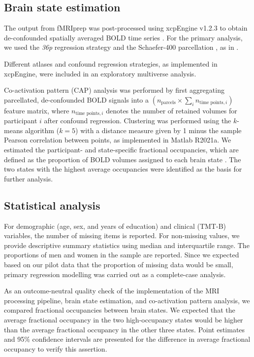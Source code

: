 \subsection{Brain state estimation}
The output from fMRIprep was post-processed using xcpEngine v1.2.3 to obtain de-confounded spatially averaged BOLD time series \citep{Ciric2017-cl}.
For the primary analysis, we used the \textit{36p} regression strategy and the Schaefer-\num{400} parcellation \citep{Schaefer2018-bo}, as in \citep{Schlemm2022-he}.
 
Different atlases and confound regression strategies, as implemented in xcpEngine, were included in an exploratory multiverse analysis.

Co-activation pattern (CAP) analysis was performed by first aggregating parcellated, de-confounded BOLD signals into a $\left(n_{\text{parcels}}\times \sum_i{n_{\text{time points}, i}}\right)$ feature matrix, where $n_{\text{time points}, i}$ denotes the number of retained volumes for participant $i$ after confound regression.
Clustering was performed using the $k$-means algorithm ($k=5$) with a distance measure given by 1 minus the sample Pearson correlation between points, as implemented in Matlab R2021a.
We estimated the participant- and state-specific fractional occupancies, which are defined as the proportion of BOLD volumes assigned to each brain state \citep{Vidaurre2018-pb}. 
The two states with the highest average occupancies were identified as the basis for further analysis.


\subsection{Statistical analysis}
For demographic (age, sex, and years of education) and clinical (TMT-B) variables, the number of missing items is reported.
For non-missing values, we provide descriptive summary statistics using median and interquartile range.
The proportions of men and women in the sample are reported. Since we expected based on our pilot data \citep{Schlemm2022-he} that the proportion of missing data would be small, primary regression modelling was carried out as a complete-case analysis.

As an outcome-neutral quality check of the implementation of the MRI processing pipeline, brain state estimation, and co-activation pattern analysis, we compared fractional occupancies between brain states.
We expected that the average fractional occupancy in the two high-occupancy states would be higher than the average fractional occupancy in the other three states.
Point estimates and 95\% confidence intervals are presented for the difference in average fractional occupancy to verify this assertion.

